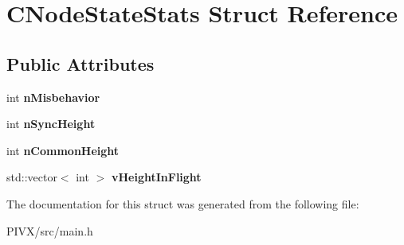 \hypertarget{struct_c_node_state_stats}{}\section{C\+Node\+State\+Stats Struct Reference}
\label{struct_c_node_state_stats}
\subsection*{Public Attributes}
\begin{DoxyCompactItemize}
\item 
\mbox{\label{struct_c_node_state_stats_a62c2243d09166c1daaad84519700da3c}} 
int {\bfseries n\+Misbehavior}
\item 
\mbox{\label{struct_c_node_state_stats_a7646deac801098e973a5bc50202f92cd}} 
int {\bfseries n\+Sync\+Height}
\item 
\mbox{\label{struct_c_node_state_stats_a67c910a57285a63bbf0bb88ea7a9ca05}} 
int {\bfseries n\+Common\+Height}
\item 
\mbox{\label{struct_c_node_state_stats_a4b03fd8ecaa9268f7eca836e5e79c35a}} 
std\+::vector$<$ int $>$ {\bfseries v\+Height\+In\+Flight}
\end{DoxyCompactItemize}


The documentation for this struct was generated from the following file\+:\begin{DoxyCompactItemize}
\item 
P\+I\+V\+X/src/main.\+h\end{DoxyCompactItemize}

